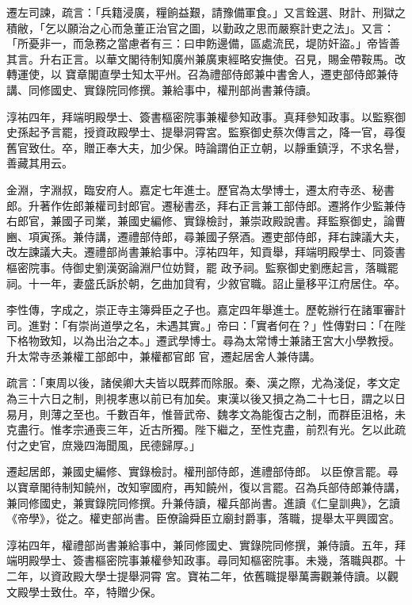 \begin{pinyinscope}
 遷左司諫，疏言：「兵籍浸廣，糧餉益艱，請豫備軍食。」又言銓選、財計、刑獄之積敝，「乞以願治之心而急董正治官之圖，以勤政之思而嚴察計吏之法」。又言：「所憂非一，而急務之當慮者有三：曰申飭邊備，區處流民，堤防奸盜。」帝皆善其言。升右正言。以華文閣待制知廣州兼廣東經略安撫使。召見，賜金帶鞍馬。改轉運使，以
 寶章閣直學士知太平州。召為禮部侍郎兼中書舍人，遷吏部侍郎兼侍講、同修國史、實錄院同修撰。兼給事中，權刑部尚書兼侍讀。



 淳祐四年，拜端明殿學士、簽書樞密院事兼權參知政事。真拜參知政事。以監察御史孫起予言罷，授資政殿學士、提舉洞霄宮。監察御史蔡次傳言之，降一官，尋復舊官致仕。卒，贈正奉大夫，加少保。時論謂伯正立朝，以靜重鎮浮，不求名譽，善藏其用云。



 金淵，字淵叔，臨安府人。嘉定七年進士。歷官為太學博士，遷太府寺丞、秘書郎。升著作佐郎兼權司封郎官。遷秘書丞，拜右正言兼工部侍郎。遷將作少監兼侍右郎官，兼國子司業，兼國史編修、實錄檢討，兼崇政殿說書。拜監察御史，論曹豳、項寅孫。兼侍講，遷禮部侍郎，尋兼國子祭酒。遷吏部侍郎，拜右諫議大夫，改左諫議大夫。遷禮部尚書兼給事中。淳祐四年，知貢舉，拜端明殿學士、同簽書樞密院事。侍御史劉漢弼論淵尸位妨賢，罷
 政予祠。監察御史劉應起言，落職罷祠。十一年，妻盛氏訴於朝，乞曲加貸宥，少敘官職。詔止量移平江府居住。卒。



 李性傳，字成之，崇正寺主簿舜臣之子也。嘉定四年舉進士。歷乾辦行在諸軍審計司。進對：「有崇尚道學之名，未遇其實。」帝曰：「實者何在？」性傳對曰：「在陛下格物致知，以為出治之本。」遷武學博士。尋為太常博士兼諸王宮大小學教授。升太常寺丞兼權工部郎中，兼權都官郎
 官，遷起居舍人兼侍講。



 疏言：「東周以後，諸侯卿大夫皆以既葬而除服。秦、漢之際，尤為淺促，孝文定為三十六日之制，則視孝惠以前已有加矣。東漢以後又損之為二十七日，謂之以日易月，則薄之至也。千數百年，惟晉武帝、魏孝文為能復古之制，而群臣沮格，未克盡行。惟孝宗通喪三年，近古所獨。陛下繼之，至性克盡，前烈有光。乞以此疏付之史官，庶幾四海聞風，民德歸厚。」



 遷起居郎，兼國史編修、實錄檢討。權刑部侍郎，進禮部侍郎。
 以臣僚言罷。尋以寶章閣待制知饒州，改知寧國府，再知饒州，復以言罷。召為兵部侍郎兼侍講，兼同修國史，兼實錄院同修撰。升兼侍讀，權兵部尚書。進讀《仁皇訓典》，乞讀《帝學》，從之。權吏部尚書。臣僚論舜臣立廟封爵事，落職，提舉太平興國宮。



 淳祐四年，權禮部尚書兼給事中，兼同修國史、實錄院同修撰，兼侍讀。五年，拜端明殿學士、簽書樞密院事兼權參知政事。尋同知樞密院事。未幾，落職與郡。十二年，以資政殿大學士提舉洞霄
 宮。寶祐二年，依舊職提舉萬壽觀兼侍讀。以觀文殿學士致仕。卒，特贈少保。




\end{pinyinscope}
